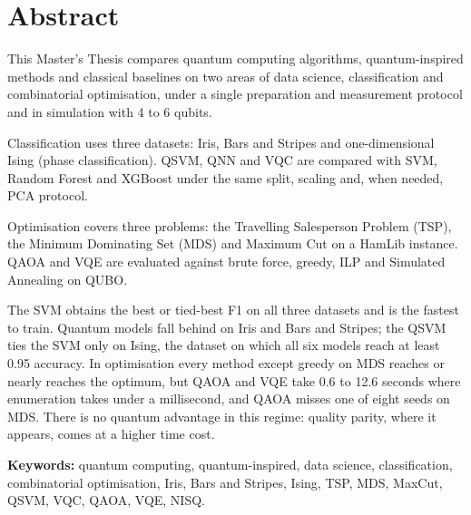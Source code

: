 \chapter{Abstract}

This Master's Thesis compares quantum computing algorithms, quantum-inspired methods and classical baselines on two areas of data science, classification and combinatorial optimisation, under a single preparation and measurement protocol and in simulation with 4 to 6 qubits.

Classification uses three datasets: Iris, Bars and Stripes and one-dimensional Ising (phase classification). QSVM, QNN and VQC are compared with SVM, Random Forest and XGBoost under the same split, scaling and, when needed, PCA protocol.

Optimisation covers three problems: the Travelling Salesperson Problem (TSP), the Minimum Dominating Set (MDS) and Maximum Cut on a HamLib instance. QAOA and VQE are evaluated against brute force, greedy, ILP and Simulated Annealing on QUBO.

The SVM obtains the best or tied-best F1 on all three datasets and is the fastest to train. Quantum models fall behind on Iris and Bars and Stripes; the QSVM ties the SVM only on Ising, the dataset on which all six models reach at least 0.95 accuracy. In optimisation every method except greedy on MDS reaches or nearly reaches the optimum, but QAOA and VQE take 0.6 to 12.6 seconds where enumeration takes under a millisecond, and QAOA misses one of eight seeds on MDS. There is no quantum advantage in this regime: quality parity, where it appears, comes at a higher time cost.

\vspace{0.5em}
\noindent\textbf{Keywords:} quantum computing, quantum-inspired, data science, classification, combinatorial optimisation, Iris, Bars and Stripes, Ising, TSP, MDS, MaxCut, QSVM, VQC, QAOA, VQE, NISQ.
